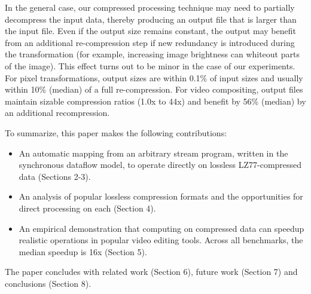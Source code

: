 In the general case, our compressed processing technique may need to
partially decompress the input data, thereby producing an output file
that is larger than the input file.  Even if the output size remains
constant, the output may benefit from an additional re-compression
step if new redundancy is introduced during the transformation (for
example, increasing image brightness can whiteout parts of the image).
This effect turns out to be minor in the case of our experiments.  For
pixel transformations, output sizes are within 0.1\% of input sizes
and usually within 10\% (median) of a full re-compression.  For video
compositing, output files maintain sizable compression ratios (1.0x to
44x) and benefit by 56\% (median) by an additional recompression.

To summarize, this paper makes the following contributions:
\begin{itemize}

\item An automatic mapping from an arbitrary stream program, written
in the synchronous dataflow model, to operate directly on lossless
LZ77-compressed data (Sections 2-3).

\item An analysis of popular lossless compression formats and the
opportunities for direct processing on each (Section 4).

\item An empirical demonstration that computing on compressed data can
speedup realistic operations in popular video editing tools.  Across
all benchmarks, the median speedup is 16x (Section 5).

\end{itemize}

The paper concludes with related work (Section 6), future work
(Section 7) and conclusions (Section 8).
